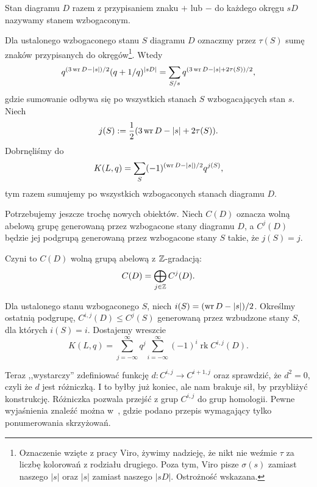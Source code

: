 \begin{definition}
%
    Stan diagramu $D$ razem z przypisaniem znaku $+$ lub $-$ do każdego okręgu $sD$ nazywamy stanem wzbogaconym.
\end{definition}

Dla ustalonego wzbogaconego stanu $S$ diagramu $D$ oznaczmy przez $\tau(S)$ sumę znaków przypisanych do okręgów\footnote{Oznaczenie wzięte z pracy Viro, żywimy nadzieję, że nikt nie weźmie $\tau$ za liczbę kolorowań z rodziału drugiego. Poza tym, Viro pisze $\sigma(s)$ zamiast naszego $|s|$ oraz $|s|$ zamiast naszego $|sD|$. Ostrożność wskazana.}.
Wtedy
\begin{equation}
    q^{(3 \operatorname{wr} D - |s|)/2} (q + 1/q)^{|sD|} = \sum_{S/s} q^{(3 \operatorname{wr} D - |s| + 2 \tau(S))/2},
\end{equation}
gdzie sumowanie odbywa się po wszystkich stanach $S$ wzbogacających stan $s$.
Niech
\begin{equation}
    j(S) := \frac 12 (3 \operatorname{wr} D - |s| + 2 \tau(S)).
\end{equation}
Dobrnęliśmy do
\begin{equation}
    K(L, q) = \sum_S (-1)^{(\operatorname{wr} D - |s|)/2} q^{j(S)},
\end{equation}
tym razem sumujemy po wszystkich wzbogaconych stanach diagramu $D$.

Potrzebujemy jeszcze trochę nowych obiektów.
Niech $C(D)$ oznacza wolną abelową grupę generowaną przez wzbogacone stany diagramu $D$, a $C^j(D)$ będzie jej podgrupą generowaną przez wzbogacone stany $S$ takie, że $j(S) = j$.

Czyni to $C(D)$ wolną grupą abelową z $\mathbb Z$-gradacją:
\begin{equation}
    C(D) = \bigoplus_{j \in \mathbb Z} C^j (D).
\end{equation}

Dla ustalonego stanu wzbogaconego $S$, niech $i(S) = (\operatorname{wr} D - |s|)/2$.
Określmy ostatnią podgrupę, $C^{i,j}(D) \le C^j(S)$ generowaną przez wzbudzone stany $S$, dla których $i(S) = i$.
Dostajemy wreszcie
\begin{equation}
    K(L, q) = \sum_{j = -\infty}^\infty q^j \sum_{i = -\infty}^\infty (-1)^i \operatorname{rk} C^{i, j}(D).
\end{equation}

Teraz ,,wystarczy'' zdefiniować funkcję $d \colon C^{i, j} \to C^{i+1, j}$ oraz sprawdzić, że $d^2 = 0$, czyli że $d$ jest różniczką.
I to byłby już koniec, ale nam brakuje sił, by przybliżyć konstrukcję.
Różniczka pozwala przejść z grup $C^{i,j}$ do grup homologii.
Pewne wyjaśnienia znaleźć można w~\cite[s. 42]{przytycki15}, gdzie podano przepis wymagający tylko ponumerowania skrzyżowań.
%

